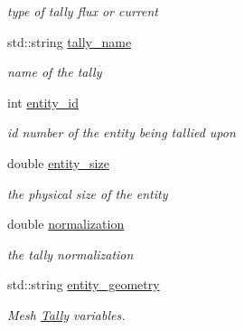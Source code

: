 \begin{DoxyCompactItemize}
\begin{DoxyCompactList}\small\item\em type of tally flux or current \end{DoxyCompactList}\item 
\mbox{\label{classpyne_1_1_tally_af5e75c809e337a06d26636020d3f1809}} 
std\+::string \hyperlink{classpyne_1_1_tally_af5e75c809e337a06d26636020d3f1809}{tally\+\_\+name}
\begin{DoxyCompactList}\small\item\em name of the tally \end{DoxyCompactList}\item 
\mbox{\label{classpyne_1_1_tally_a84aa789b361f4323e2906a411ef3a791}} 
int \hyperlink{classpyne_1_1_tally_a84aa789b361f4323e2906a411ef3a791}{entity\+\_\+id}
\begin{DoxyCompactList}\small\item\em id number of the entity being tallied upon \end{DoxyCompactList}\item 
\mbox{\label{classpyne_1_1_tally_a1a19c1b79ed25ea2a3d08b15b30bbea1}} 
double \hyperlink{classpyne_1_1_tally_a1a19c1b79ed25ea2a3d08b15b30bbea1}{entity\+\_\+size}
\begin{DoxyCompactList}\small\item\em the physical size of the entity \end{DoxyCompactList}\item 
\mbox{\label{classpyne_1_1_tally_a8ff1eb44926ad1e415386983679c78f1}} 
double \hyperlink{classpyne_1_1_tally_a8ff1eb44926ad1e415386983679c78f1}{normalization}
\begin{DoxyCompactList}\small\item\em the tally normalization \end{DoxyCompactList}\item 
std\+::string \hyperlink{classpyne_1_1_tally_a297bfdf2ab5822812c7c1b5c4eb03a2a}{entity\+\_\+geometry}
\begin{DoxyCompactList}\small\item\em Mesh \hyperlink{classpyne_1_1_tally}{Tally} variables. \end{DoxyCompactList}\item 
\mbox{\label{classpyne_1_1_tally_a212b4cbcac800f5812b7698e9827eed3}} 

\end{DoxyCompactItemize}
